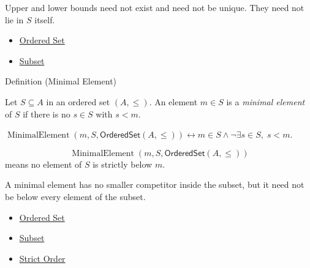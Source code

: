 \begin{remark*}[Exposition]
Upper and lower bounds need not exist and need not be unique. They need not lie
in $S$ itself.
\end{remark*}

\begin{dependencies}
\begin{itemize}
  \item \hyperref[def:ordered-set]{Ordered Set}
  \item \hyperref[def:subset]{Subset}
\end{itemize}
\end{dependencies}

\begin{definitionbox}{Definition (Minimal Element)}
\begin{definition}\label{def:order-minimal-element}
Let $S \subseteq A$ in an ordered set $(A,\leq)$. An element $m \in S$ is a
\emph{minimal element} of $S$ if there is no $s \in S$ with $s < m$.
\end{definition}
\end{definitionbox}

\begin{remark*}
$\operatorname{MinimalElement}(m,S,\mathsf{OrderedSet}(A,\leq))
\leftrightarrow m\in S\wedge \neg\exists s\in S,\;s<m$.
\end{remark*}

\begin{remark*}
\[
  \operatorname{MinimalElement}(m,S,\mathsf{OrderedSet}(A,\leq))
\] means no
element of $S$ is strictly below $m$.
\end{remark*}

\begin{remark*}[Interpretation]
A minimal element has no smaller competitor inside the subset, but it need not
be below every element of the subset.
\end{remark*}

\begin{dependencies}
\begin{itemize}
  \item \hyperref[def:ordered-set]{Ordered Set}
  \item \hyperref[def:subset]{Subset}
  \item \hyperref[def:strict-order]{Strict Order}
\end{itemize}
\end{dependencies}

